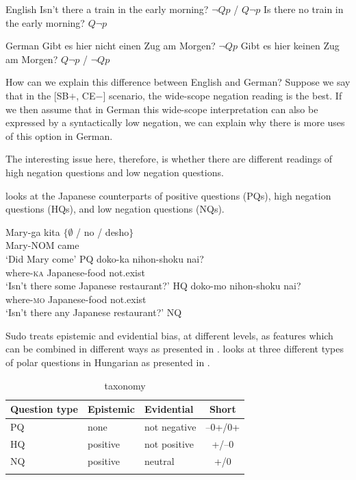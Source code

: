 \documentclass[output=paper,colorlinks,citecolor=brown]{langscibook}
\begin{document}
\ea English
\ea Isn't there a train in the early morning? \hfill $\neg Qp$ / $Q\neg p$
\ex Is there no train in the early morning? \hfill $Q \neg p$
\z

\ex German
\ea Gibt es hier nicht einen Zug am Morgen? \hfill $\neg Qp$
\ex Gibt es hier keinen Zug am Morgen? \hfill $Q\neg p$ / $\neg Qp$
\z
\z

How can we explain this difference between English and German? Suppose we say that in the [SB$+$, CE$-$] scenario, the wide-scope negation reading is the best. If we then assume that in German this wide-scope interpretation can also be expressed by a syntactically low negation, we can explain why there is more uses of this option in German.

The interesting issue here, therefore, is whether there are different readings of high negation questions and low negation questions. 

\citet{sudo2013biased} looks at the Japanese counterparts of positive questions (PQs), high negation questions (HQs), and low negation questions (NQs). 

\ea
\gll Mary-ga kita $\{\emptyset$ / no / desho$\}$\\
Mary-NOM came\\ 
\glt `Did Mary come' \hfill PQ 
\ex
\gll doko-ka nihon-shoku nai?\\
where-\textsc{ka} Japanese-food not.exist\\
\glt `Isn't there some Japanese restaurant?' \hfill HQ
\ex
\gll doko-mo nihon-shoku nai?\\
where-\textsc{mo} Japanese-food not.exist\\
\glt `Isn't there any Japanese restaurant?' \hfill NQ
\z

Sudo treats epistemic and evidential bias, at different levels, as features which can be combined in different ways as presented in . \citet{gyuris2017new} looks at three different types of polar questions in Hungarian as presented in .

\begin{table}
\caption{ taxonomy}
\label{figtab:chart45}
\begin{tabularx}{\textwidth}{XXXc}
\lsptoprule
 Question type & Epistemic &  Evidential & Short\\
 \midrule
 PQ            & none      &  not negative &  --0+/0+\\
 HQ            & positive  &  not positive & +/--0\\
NQ             &  positive & neutral        & +/0\\
\lspbottomrule
\end{tabularx}
\end{table}
\end{document}

